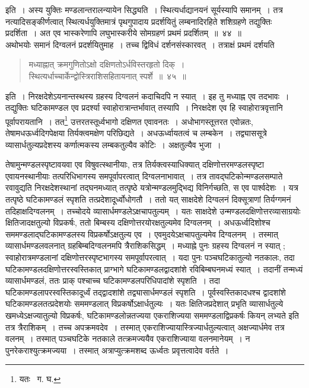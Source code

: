 \documentclass[11pt, openany]{book}
\begin{document}
\noindent इति~। अस्य युक्तिः मण्डलान्तरालन्यायेन सिद्ध्यति~। स्थित्यर्धाद्यानयनं सूर्यस्यापि समानम्~। तत्र नत्यादिसङ्कीर्णत्वात्
स्थित्यर्धयुक्तिमात्रं पृथगुपादाय प्रदर्शयितुं लम्बनादिरहिते शशिग्रहणे तद्युक्तिः प्रदर्शिता~। अत एव भास्करेणापि लघुभास्करीये सोमग्रहणं प्रथमं प्रदर्शितम्~॥~४४~॥\\

\indent अथोभयोः समानं दिग्वलनं प्रदर्शयितुमाह~। तच्च द्विविधं दर्शनसंस्कारवत्~। तत्राक्षं प्रथमं दर्शयति\textendash 

\begin{quote}
{\ab मध्याह्नात् क्रमगुणितोऽक्षो दक्षिणतोऽर्धविस्तरहृतो दिक्~।\\
	स्थित्यर्धाच्चार्केन्द्वोस्त्रिराशिसहितायनात् स्पर्शे~॥~४५~॥} 
\end{quote}

\indent इति~। निरक्षदेशेऽयनान्तस्थस्य ग्रहस्य दिग्वलनं कदाचिदपि न स्यात्~। इह तु मध्याह्न एव तदभावः~। तद्युक्तिः घटिकामण्डल एव
प्रदर्श्या स्वाहोरात्रान्तर्भावात् तस्यापि~। निरक्षदेश एव हि स्वाहोरात्रवृत्तानि पूर्वापरायतानि~। तत\renewcommand{\thefootnote}{१}\footnote{यतः \textendash\ ग. घ.} उत्तरतस्तूर्ध्वभागो दक्षिणत एवावनतः~। अधोभागस्तूत्तरत एवोन्नतः, तेषामधऊर्ध्वदिगपेक्षया तिर्यक्त्वमक्षेण परिछिद्यते~। अधऊर्ध्वायतत्वं च लम्बकेन~। तद्व्याससूत्रे व्यासार्धतुल्यप्रदेशस्य कर्णात्मकस्य लम्बकतुल्यैव कोटिः~। अक्षतुल्यैव भुजा~।

\newpage

\noindent तेषामुन्मण्डलस्पृष्टावयवा एव विषुवत्स्थानीयाः, तत्र तिर्यक्त्वस्याधिक्यात् दक्षिणोत्तरमण्डलस्पृष्टा एवायनस्थानीयाः तत्परिधिभागस्य समपूर्वापरत्वात् दिग्वलनाभावात्~। तत्र तावद्घटिकोन्मण्डलसम्पाते रवावुद्यति निरक्षदेशस्थानां तद्घनमध्यात् तत्पृष्ठे यत्रोन्मण्डलमुद्भिद्य विनिर्गच्छति, स एव पार्श्वदेशः~। यत्र तत्पृष्ठे घटिकामण्डलं स्पृशति तत्प्रदेशादूर्ध्वोधोगतौ~। ततो यत् साक्षदेशे दिग्वलनं दिक्सूत्राणां तिर्यग्गमनं
तदिहाक्षदिग्वलनम्~। तच्चोदये व्यासार्धमण्डलेऽक्षचापतुल्यम्~। यतः साक्षदेशे उन्मण्डलदक्षिणोत्तरव्यासाग्रयोः क्षितिजादक्षतुल्यो विप्रकर्षः, ततो
बिम्बस्य दक्षिणोत्तरयोरक्षतुल्यमेव दिग्वलनम्~। अधऊर्ध्वदिशोश्च सममण्डलाद्घटिकामण्डलस्य विप्रकर्षोऽक्षतुल्य एव~। एवमुदयेऽक्षचापतुल्यमेव दिग्वलनम्~। तस्मात् व्यासार्धमण्डलवलनात् ग्रहबिम्बदिग्वलनमपि त्रैराशिकसिद्धम्~। मध्याह्ने पुनः ग्रहस्य दिग्वलनं न स्यात् ; स्वाहोरात्रमण्डलानां दक्षिणोत्तरस्पृष्टभागस्य समपूर्वापरत्वात्~। यदा पुनः पञ्चघटिकातुल्यो नतकालः, तदा घटिकामण्डलदक्षिणोत्तरस्वस्तिकात् प्राग्भागे घटिकामण्डलद्वादशांशे रविबिम्बघनमध्यं स्यात्~। तदानीं तन्मध्यं व्यासार्धमण्डलं, ततः प्राक् पश्चाच्च घटिकामण्डलपरिधिपादांशे स्पृशति~। तदा घटिकामण्डलापरस्वस्तिकादूर्ध्वं तद्द्वादशांशे तद्व्यासार्धमण्डलं स्पृशति~। पूर्वस्वस्तिकादधश्च द्वादशांशे घटिकामण्डलतत्प्रदेशयोः सममण्डलात् विप्रकर्षोऽक्षार्धतुल्यः~। यतः क्षितिजप्रदेशात् प्रभृति व्यासार्धतुल्ये खमध्येऽक्षज्यातुल्यो विप्रकर्षः, घटिकामण्डलोन्नतज्यया एकराशिज्यया सममण्डलाद्विप्रकर्षः कियन् लभ्यते इति तत्र त्रैराशिकम्~। तच्च अपक्रमवदेव~। तस्मात् एकराशिज्यायास्त्रिज्यार्धतुल्यत्वात् अक्षज्यार्धमेव तत्र वलनम्~। तस्मात् पञ्चघटिके नतकाले तत्क्रमज्ययैव एकराशिज्याया वलनमानेयम्~। न पुनरेकराश्युत्क्रमज्यया~। तस्मात् अत्राप्युत्क्रमशब्द ऊर्ध्वतः प्रवृत्तत्वादेव वर्तते~।
\end{document}
